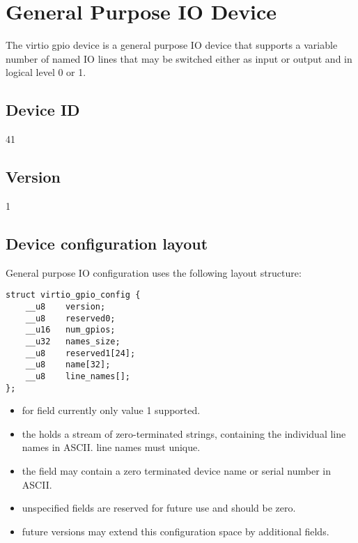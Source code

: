 \section{General Purpose IO Device}\label{sec:Device Types / General Purpose IO}

The virtio gpio device is a general purpose IO device that supports a variable
number of named IO lines that may be switched either as input or output and
in logical level 0 or 1.

\subsection{Device ID}\label{sec:Device Types / General Purpose IO / Device ID}
  41

\subsection{Version}\label{sec:Device Types / General Purpose IO / Version}
  1

\subsection{Device configuration layout}\label{sec:Device Types / General Purpose IO / Device configuration layout}

General purpose IO configuration uses the following layout structure:

\begin{lstlisting}
struct virtio_gpio_config {
    __u8    version;
    __u8    reserved0;
    __u16   num_gpios;
    __u32   names_size;
    __u8    reserved1[24];
    __u8    name[32];
    __u8    line_names[];
};
\end{lstlisting}

\begin{itemize}
    \item for  field currently only value 1 supported.
    \item the  holds a stream of zero-terminated strings,
        containing the individual line names in ASCII. line names must unique.
    \item the  field may contain a zero terminated device name
          or serial number in ASCII.
    \item unspecified fields are reserved for future use and should be zero.
    \item future versions may extend this configuration space by additional fields.
\end{itemize}

